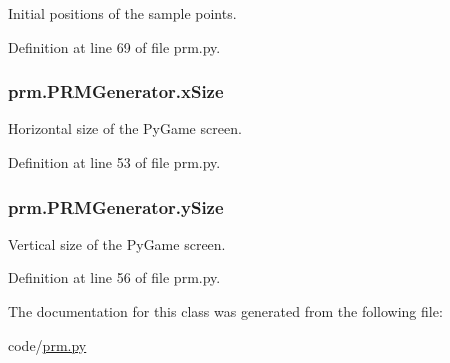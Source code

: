 Initial positions of the sample points. 



Definition at line 69 of file prm.\-py.

\hypertarget{classprm_1_1PRMGenerator_a0cf38de489be01fc5ed01c1a59da8f0b}{
\subsubsection[{x\-Size}]{\setlength{\rightskip}{0pt plus 5cm}prm.\-P\-R\-M\-Generator.\-x\-Size}}\label{classprm_1_1PRMGenerator_a0cf38de489be01fc5ed01c1a59da8f0b}


Horizontal size of the Py\-Game screen. 



Definition at line 53 of file prm.\-py.

\hypertarget{classprm_1_1PRMGenerator_aaa5cf5ecddd099bf8c294cad0b33be92}{
\subsubsection[{y\-Size}]{\setlength{\rightskip}{0pt plus 5cm}prm.\-P\-R\-M\-Generator.\-y\-Size}}\label{classprm_1_1PRMGenerator_aaa5cf5ecddd099bf8c294cad0b33be92}


Vertical size of the Py\-Game screen. 



Definition at line 56 of file prm.\-py.



The documentation for this class was generated from the following file\-:\begin{DoxyCompactItemize}
\item 
code/\hyperlink{prm_8py}{prm.\-py}\end{DoxyCompactItemize}
